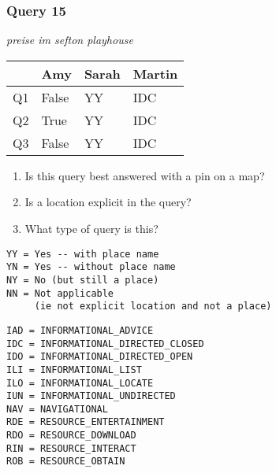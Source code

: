 \begin{frame}[fragile]
\frametitle{Query 15}
\vspace{1em}

\emph{preise im sefton playhouse}

\vfill

\begin{table}
  \centering
  \begin{tabular}{ l l l l }
    & \textbf{Amy} & \textbf{Sarah} & \textbf{Martin}\\
    \toprule
    Q1 & False & YY & IDC\\
Q2 & True & YY & IDC\\
Q3 & False & YY & IDC\\
    \bottomrule
  \end{tabular}
\end{table}

\vfill

\tiny{

\begin{enumerate}
\item Is this query best answered with a pin on a map?
\item Is a location explicit in the query?
\item What type of query is this?
\end{enumerate}

\vfill

\begin{multicols}{2}
\begin{verbatim}
YY = Yes -- with place name
YN = Yes -- without place name
NY = No (but still a place)
NN = Not applicable 
     (ie not explicit location and not a place)
\end{verbatim}

\columnbreak
\begin{verbatim}
IAD = INFORMATIONAL_ADVICE
IDC = INFORMATIONAL_DIRECTED_CLOSED
IDO = INFORMATIONAL_DIRECTED_OPEN
ILI = INFORMATIONAL_LIST
ILO = INFORMATIONAL_LOCATE
IUN = INFORMATIONAL_UNDIRECTED
NAV = NAVIGATIONAL
RDE = RESOURCE_ENTERTAINMENT
RDO = RESOURCE_DOWNLOAD
RIN = RESOURCE_INTERACT
ROB = RESOURCE_OBTAIN
\end{verbatim}
\end{multicols}
}

\end{frame}


